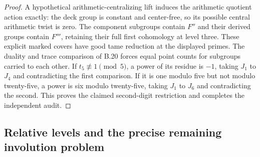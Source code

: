 \begin{proof}
A hypothetical arithmetic-centralizing lift induces the
arithmetic quotient action exactly: the deck group is constant
and center-free, so its possible central arithmetic twist is
zero. The component subgroups contain $F''$ and their derived
groups contain $F'''$, retaining their full first cohomology at
level three. These explicit marked covers have good tame
reduction at the displayed primes. The duality and trace
comparison of B.20 forces equal point counts for subgroups
carried to each other. If $t_5\not\equiv1\pmod5$, a power of
its residue is $-1$, taking $J_1$ to $J_4$ and contradicting
the first comparison. If it is one modulo five but not modulo
twenty-five, a power is six modulo twenty-five, taking $J_1$
to $J_6$ and contradicting the second. This proves the claimed
second-digit restriction and completes the independent audit.
\end{proof}

\subsection{Relative levels and the precise remaining involution problem}

